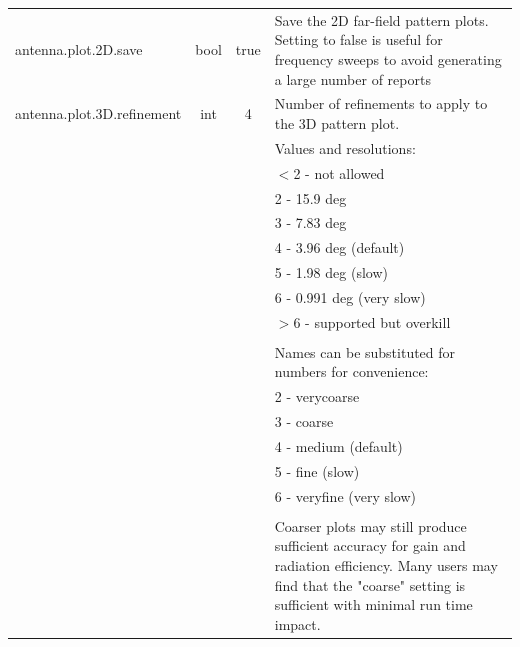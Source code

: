 \documentclass[titlepage]{article}
\renewcommand\_{\textunderscore\linebreak[1]}
\begin{document}
\begin{longtable}[c]{|lccp{8cm}|}
    antenna.plot.2D.save          & bool   & true   & Save the 2D far-field pattern plots.  Setting to false is useful for frequency sweeps to avoid generating a large number of reports \\
    antenna.plot.3D.refinement    & int    & 4      & Number of refinements to apply to the 3D pattern plot. \\
                                  &        &        &    Values and resolutions: \\
                                  &        &        &      $<$2 - not allowed \\
                                  &        &        &       2 - 15.9 deg \\
                                  &        &        &       3 - 7.83 deg \\
                                  &        &        &       4 - 3.96 deg  (default) \\
                                  &        &        &       5 - 1.98 deg  (slow) \\
                                  &        &        &       6 - 0.991 deg (very slow) \\
                                  &        &        &      $>$6 - supported but overkill \\
                                  &        &        &    \\
                                  &        &        &    Names can be substituted for numbers for convenience: \\
                                  &        &        &       2 - verycoarse \\
                                  &        &        &       3 - coarse \\
                                  &        &        &       4 - medium    (default) \\
                                  &        &        &       5 - fine      (slow) \\
                                  &        &        &       6 - veryfine  (very slow) \\
                                  &        &        &    \\
                                  &        &        &    Coarser plots may still produce sufficient accuracy for gain and radiation efficiency. Many users may find that the "coarse" setting is sufficient with minimal run time impact. \\

\end{longtable}
\end{document}
